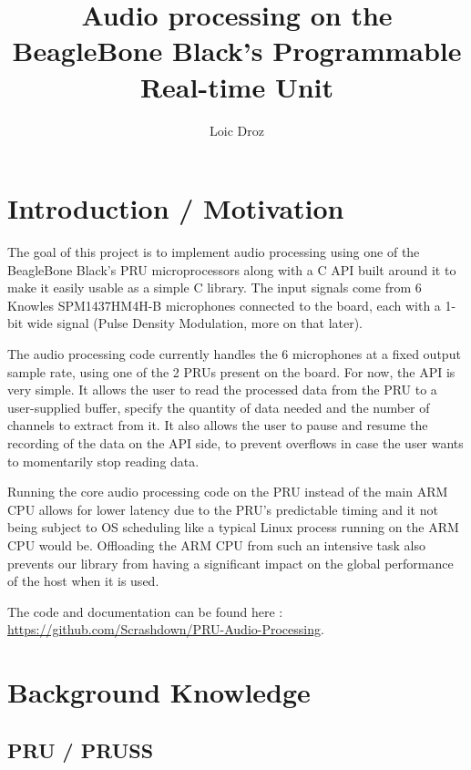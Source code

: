 \documentclass[]{report}
\title{Audio processing on the BeagleBone Black's Programmable Real-time Unit}
\author{Loic Droz}
\begin{document}
\maketitle
\tableofcontents


\hypertarget{introduction-motivation}{%
\chapter{Introduction / Motivation}\label{introduction-motivation}}


The goal of this project is to implement audio processing using one of
the BeagleBone Black's PRU microprocessors along with a C API built
around it to make it easily usable as a simple C library. The input
signals come from 6 Knowles SPM1437HM4H-B microphones connected to the
board, each with a 1-bit wide signal (Pulse Density Modulation, more on
that later).



The audio processing code currently handles the 6 microphones at a fixed
output sample rate, using one of the 2 PRUs present on the board. For
now, the API is very simple. It allows the user to read the processed
data from the PRU to a user-supplied buffer, specify the quantity of
data needed and the number of channels to extract from it. It also
allows the user to pause and resume the recording of the data on the API
side, to prevent overflows in case the user wants to momentarily stop
reading data.

Running the core audio processing code on the PRU instead of the main
ARM CPU allows for lower latency due to the PRU's predictable timing and
it not being subject to OS scheduling like a typical Linux process
running on the ARM CPU would be. Offloading the ARM CPU from such an
intensive task also prevents our library from having a significant
impact on the global performance of the host when it is used.

The code and documentation can be found here :
\url{https://github.com/Scrashdown/PRU-Audio-Processing}.

	\chapter{Background Knowledge}
	\label{theory}

\hypertarget{pru-pruss}{%
\section{PRU / PRUSS}\label{pru-pruss}}
\end{document}
